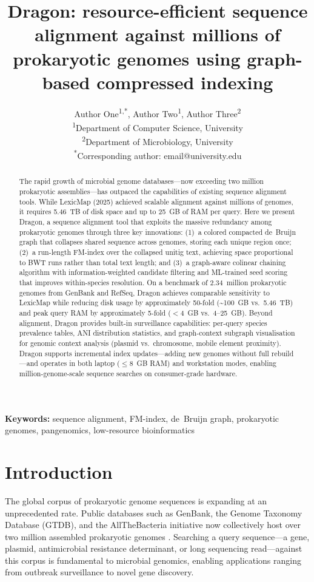 \documentclass[11pt]{article}
\title{Dragon: resource-efficient sequence alignment against millions of prokaryotic genomes using graph-based compressed indexing}
\author{
  Author One\textsuperscript{1,*},
  Author Two\textsuperscript{1},
  Author Three\textsuperscript{2} \\[6pt]
  \textsuperscript{1}Department of Computer Science, University \\
  \textsuperscript{2}Department of Microbiology, University \\[4pt]
  \textsuperscript{*}Corresponding author: email@university.edu
}
\date{}
\begin{document}
\maketitle

\begin{abstract}
The rapid growth of microbial genome databases---now exceeding two million prokaryotic assemblies---has outpaced the capabilities of existing sequence alignment tools. While LexicMap (2025) achieved scalable alignment against millions of genomes, it requires 5.46~TB of disk space and up to 25~GB of RAM per query. Here we present Dragon, a sequence alignment tool that exploits the massive redundancy among prokaryotic genomes through three key innovations: (1)~a colored compacted de~Bruijn graph that collapses shared sequence across genomes, storing each unique region once; (2)~a run-length FM-index over the collapsed unitig text, achieving space proportional to BWT runs rather than total text length; and (3)~a graph-aware colinear chaining algorithm with information-weighted candidate filtering and ML-trained seed scoring that improves within-species resolution. On a benchmark of 2.34~million prokaryotic genomes from GenBank and RefSeq, Dragon achieves comparable sensitivity to LexicMap while reducing disk usage by approximately 50-fold (\textasciitilde100~GB vs.\ 5.46~TB) and peak query RAM by approximately 5-fold ($<$4~GB vs.\ 4--25~GB). Beyond alignment, Dragon provides built-in surveillance capabilities: per-query species prevalence tables, ANI distribution statistics, and graph-context subgraph visualisation for genomic context analysis (plasmid vs.\ chromosome, mobile element proximity). Dragon supports incremental index updates---adding new genomes without full rebuild---and operates in both laptop ($\leq$8~GB RAM) and workstation modes, enabling million-genome-scale sequence searches on consumer-grade hardware.
\end{abstract}

\textbf{Keywords:} sequence alignment, FM-index, de~Bruijn graph, prokaryotic genomes, pangenomics, low-resource bioinformatics

\section{Introduction}

The global corpus of prokaryotic genome sequences is expanding at an unprecedented rate. Public databases such as GenBank, the Genome Taxonomy Database (GTDB), and the AllTheBacteria initiative now collectively host over two million assembled prokaryotic genomes \citep{parks2022gtdb,blackwell2024allthebacteria}. Searching a query sequence---a gene, plasmid, antimicrobial resistance determinant, or long sequencing read---against this corpus is fundamental to microbial genomics, enabling applications ranging from outbreak surveillance to novel gene discovery.
\end{document}

